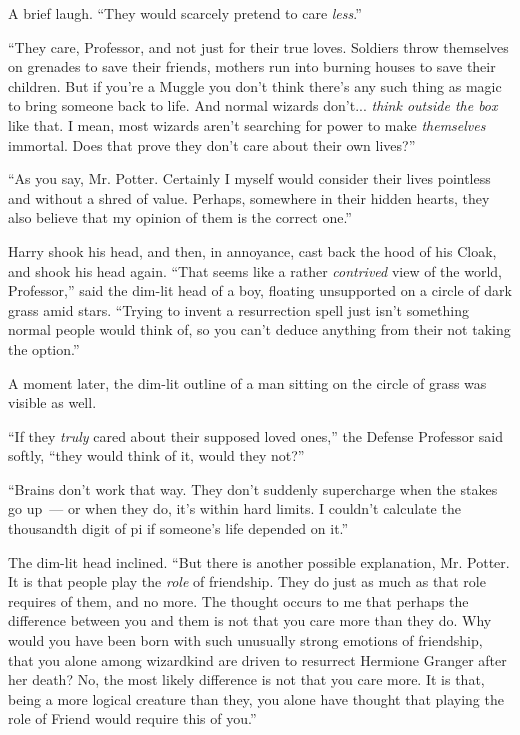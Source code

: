A brief laugh. ``They would scarcely pretend to care \emph{less}.''

``They care, Professor, and not just for their true loves. Soldiers throw themselves on grenades to save their friends, mothers run into burning houses to save their children. But if you're a Muggle you don't think there's any such thing as magic to bring someone back to life. And normal wizards don't... \emph{think outside the box} like that. I mean, most wizards aren't searching for power to make \emph{themselves} immortal. Does that prove they don't care about their own lives?''

``As you say, Mr. Potter. Certainly I myself would consider their lives pointless and without a shred of value. Perhaps, somewhere in their hidden hearts, they also believe that my opinion of them is the correct one.''

Harry shook his head, and then, in annoyance, cast back the hood of his Cloak, and shook his head again. ``That seems like a rather \emph{contrived} view of the world, Professor,'' said the dim-lit head of a boy, floating unsupported on a circle of dark grass amid stars. ``Trying to invent a resurrection spell just isn't something normal people would think of, so you can't deduce anything from their not taking the option.''

A moment later, the dim-lit outline of a man sitting on the circle of grass was visible as well.

``If they \emph{truly} cared about their supposed loved ones,'' the Defense Professor said softly, ``they would think of it, would they not?''

``Brains don't work that way. They don't suddenly supercharge when the stakes go up~--- or when they do, it's within hard limits. I couldn't calculate the thousandth digit of pi if someone's life depended on it.''

The dim-lit head inclined. ``But there is another possible explanation, Mr. Potter. It is that people play the \emph{role} of friendship. They do just as much as that role requires of them, and no more. The thought occurs to me that perhaps the difference between you and them is not that you care more than they do. Why would you have been born with such unusually strong emotions of friendship, that you alone among wizardkind are driven to resurrect Hermione Granger after her death? No, the most likely difference is not that you care more. It is that, being a more logical creature than they, you alone have thought that playing the role of Friend would require this of you.''

